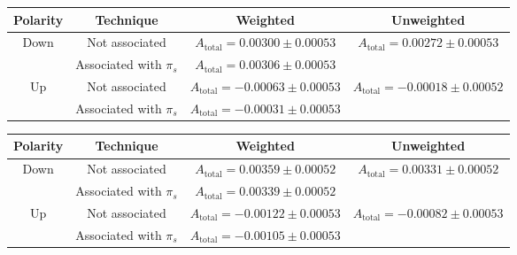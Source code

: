 \documentclass{article}
\begin{document}
        \begin{center}
                \begin{tabular}{c|c|c|c}
                        Polarity & Technique & Weighted & Unweighted\\
                        \hline\hline
                        \multirow{2}{*}{Down} & Not associated & $A_\text{total} = 0.00300 \pm 0.00053$ & \multirow{2}{*}{$A_\text{total} = 0.00272 \pm 0.00053$}\\
                        \cline{2-3}
                        & Associated with $\pi_s$ & $A_\text{total} = 0.00306 \pm 0.00053$ & \\
                        \hline
                        \multirow{2}{*}{Up} & Not associated & $A_\text{total} = - 0.00063 \pm 0.00053$ & \multirow{2}{*}{$A_\text{total} = - 0.00018 \pm 0.00052$}\\
                        \cline{2-3}
                        & Associated with $\pi_s$ & $A_\text{total} = - 0.00031 \pm 0.00053$ & \\
                \end{tabular}
                \label{tab:2015}
        \end{center}
        \begin{center}
                \begin{tabular}{c|c|c|c}
                        Polarity & Technique & Weighted & Unweighted\\
                        \hline\hline
                        \multirow{2}{*}{Down} & Not associated & $A_\text{total} = 0.00359 \pm 0.00052$ & \multirow{2}{*}{$A_\text{total} = 0.00331 \pm 0.00052$}\\
                        \cline{2-3}
                        & Associated with $\pi_s$ & $A_\text{total} = 0.00339 \pm 0.00052$ & \\
                        \hline
                        \multirow{2}{*}{Up} & Not associated & $A_\text{total} = - 0.00122 \pm 0.00053$ & \multirow{2}{*}{$A_\text{total} = - 0.00082 \pm 0.00053$}\\
                        \cline{2-3}
                        & Associated with $\pi_s$ & $A_\text{total} = - 0.00105 \pm 0.00053$ & \\
                \end{tabular}
                \label{tab:2016}
        \end{center}
\end{document}
